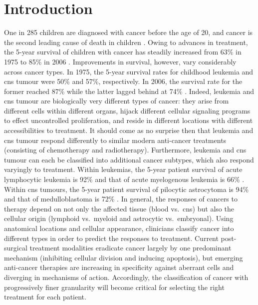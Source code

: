 \chapter{Introduction}
\label{ch:intro}

One in 285 children are diagnosed with cancer before the age of 20, and cancer is the second leading cause of death in children . Owing to advances in treatment, the 5-year survival of children with cancer has steadily increased from 63\% in 1975 to 85\% in 2006 . Improvements in survival, however, vary considerably across cancer types. In 1975, the 5-year survival rates for childhood leukemia and \gls{cns} tumour were 50\% and 57\%, respectively. In 2006, the survival rate for the former reached 87\% while the latter lagged behind at 74\% . Indeed, leukemia and \gls{cns} tumour are biologically very different types of cancer: they arise from different cells within different organs, hijack different cellular signaling programs to effect uncontrolled proliferation, and reside in different locations with different accessibilities to treatment. It should come as no surprise then that leukemia and \gls{cns} tumour respond differently to similar modern anti-cancer treatments (consisting of chemotherapy and radiotherapy). Furthermore, leukemia and \gls{cns} tumour can each be classified into additional cancer subtypes, which also respond varyingly to treatment. Within leukemias, the 5-year patient survival of acute lymphocytic leukemia is 92\% and that of acute myelogenous leukemia is 66\% . Within \gls{cns} tumours, the 5-year patient survival of pilocytic astrocytoma is 94\% and that of medulloblastoma is 72\% . In general, the responses of cancers to therapy depend on not only the affected tissue (blood vs.\ \gls{cns}) but also the cellular origin (lymphoid vs.\ myeloid and astrocytic vs.\ embryonal). Using anatomical locations and cellular appearance, clinicians classify cancer into different types in order to predict the responses to treatment. Current post-surgical treatment modalities eradicate cancer largely by one predominant mechanism (inhibiting cellular division and inducing apoptosis), but emerging anti-cancer therapies are increasing in specificity against aberrant cells and diverging in mechanisms of action. Accordingly, the classification of cancer with progressively finer granularity will become critical for selecting the right treatment for each patient.

